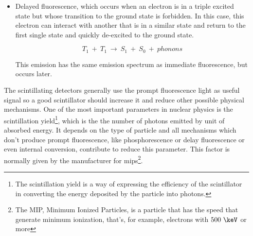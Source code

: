 \begin{itemize}
\item{} Delayed fluorescence, which occurs when an electron is in a triple excited state but whose transition to the ground state is forbidden. In this case, this electron can interact with another that is in a similar state and return to the first single state and quickly de-excited to the ground state. 

\begin{equation}
T_{1} ~+~ T_{1}~ \longrightarrow ~ S_{1} ~+~ S_{0} ~+~ phonons
\label{eq:DelayFluorescence}
\end{equation}

This emission has the same emission spectrum as immediate fluorescence, but occurs later.
\end{itemize}

The scintillating detectors generally use the prompt fluorescence light as useful signal so a good scintillator should increase it and reduce other possible physical mechanisms. One of the most important parameters in nuclear physics is the scintillation yield\footnote{The scintillation yield is a way of expressing the efficiency of the scintillator in converting the energy deposited by the particle into photons.}, which is the the number of photons emitted by unit of absorbed energy. It depends on the type of particle and all mechanisms which don't produce prompt fluorescence, like phosphorescence or delay fluorescence or even internal conversion, contribute to reduce this parameter. This factor is normally given by the manufacturer for mips\footnote{The MIP, Minimum Ionized Particles, is a particle that has the speed that generate minimum ionization, that's, for example, electrons with $500~\keV$ or more}.
